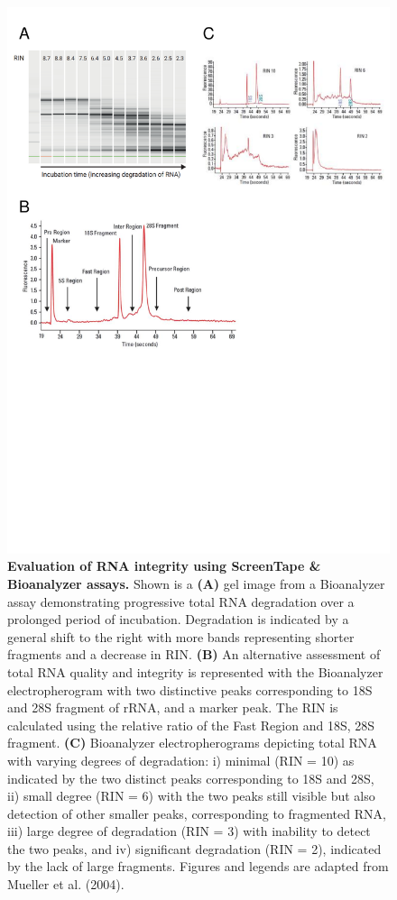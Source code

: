 \begin{figure}[htp]
	\centering
	\vspace{20pt}
	\includegraphics[page=1,trim={0 10cm 0 0 },clip, scale = 0.7]{Figures/General_Methodology_Figures.pdf}
	\captionsetup{width=0.95\textwidth}
	\caption[Evaluation of RNA integrity using ScreenTape \& Bioanalyzer assays]%
	{\textbf{Evaluation of RNA integrity using ScreenTape \& Bioanalyzer assays.} Shown is a \textbf{(A)} gel image from a Bioanalyzer assay demonstrating progressive total RNA degradation over a prolonged period of incubation. Degradation is indicated by a general shift to the right with more bands representing shorter fragments and a decrease in RIN. \textbf{(B)} An alternative assessment of total RNA quality and integrity is represented with the Bioanalyzer electropherogram with two distinctive peaks corresponding to 18S and 28S fragment of rRNA, and a marker peak. The RIN is calculated using the relative ratio of the Fast Region and 18S, 28S fragment. \textbf{(C)} Bioanalyzer electropherograms depicting total RNA with varying degrees of degradation: i) minimal (RIN = 10) as indicated by the two distinct peaks corresponding to 18S and 28S, ii) small degree (RIN = 6) with the two peaks still visible but also detection of other smaller peaks, corresponding to fragmented RNA, iii) large degree of degradation (RIN = 3) with inability to detect the two peaks, and iv) significant degradation (RIN = 2), indicated by the lack of large fragments. Figures and legends are adapted from Mueller et al. (2004)\cite{Mueller}.}

\end{figure}
